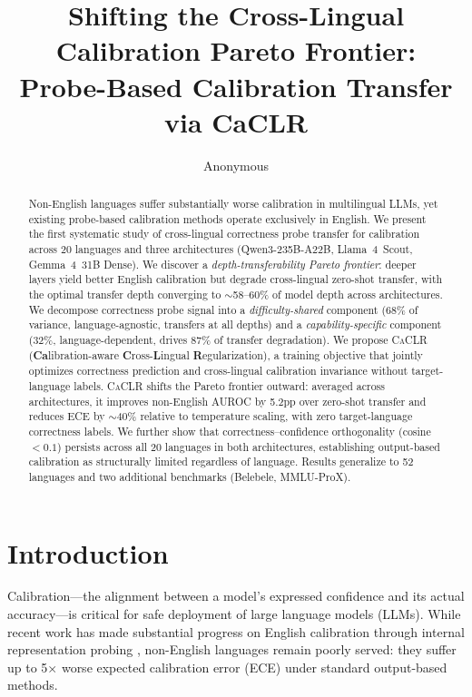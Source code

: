 \documentclass[11pt,a4paper]{article}
\title{Shifting the Cross-Lingual Calibration Pareto Frontier:\\Probe-Based Calibration Transfer via CaCLR}
\author{Anonymous}
\newcommand{\caclr}{\textsc{CaCLR}}
\begin{document}
\maketitle

\begin{abstract}
Non-English languages suffer substantially worse calibration in multilingual LLMs, yet existing probe-based calibration methods operate exclusively in English.
We present the first systematic study of cross-lingual correctness probe transfer for calibration across 20 languages and three architectures (Qwen3-235B-A22B, Llama~4~Scout, Gemma~4~31B Dense).
We discover a \emph{depth-transferability Pareto frontier}: deeper layers yield better English calibration but degrade cross-lingual zero-shot transfer, with the optimal transfer depth converging to $\sim$58--60\% of model depth across architectures.
We decompose correctness probe signal into a \emph{difficulty-shared} component (68\% of variance, language-agnostic, transfers at all depths) and a \emph{capability-specific} component (32\%, language-dependent, drives 87\% of transfer degradation).
We propose \caclr{} (\textbf{Ca}libration-aware \textbf{C}ross-\textbf{L}ingual \textbf{R}egularization), a training objective that jointly optimizes correctness prediction and cross-lingual calibration invariance without target-language labels.
\caclr{} shifts the Pareto frontier outward: averaged across architectures, it improves non-English AUROC by 5.2pp over zero-shot transfer and reduces ECE by $\sim$40\% relative to temperature scaling, with zero target-language correctness labels.
We further show that correctness--confidence orthogonality (cosine $<0.1$) persists across all 20 languages in both architectures, establishing output-based calibration as structurally limited regardless of language.
Results generalize to 52 languages and two additional benchmarks (Belebele, MMLU-ProX).
\end{abstract}

\section{Introduction}
\label{sec:intro}

Calibration---the alignment between a model's expressed confidence and its actual accuracy---is critical for safe deployment of large language models (LLMs). While recent work has made substantial progress on English calibration through internal representation probing \cite{burns2023discovering,marks2024geometry,miao2026coral}, non-English languages remain poorly served: they suffer up to 5$\times$ worse expected calibration error (ECE) under standard output-based methods.
\end{document}

